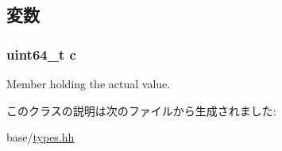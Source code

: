 \subsection{変数}
\hypertarget{classCycles_ac0abe12146ab4394bf65e09035ef054c}{
\subsubsection[{c}]{\setlength{\rightskip}{0pt plus 5cm}uint64\_\-t {\bf c}}}
\label{classCycles_ac0abe12146ab4394bf65e09035ef054c}
Member holding the actual value. 

このクラスの説明は次のファイルから生成されました:\begin{DoxyCompactItemize}
\item 
base/\hyperlink{base_2types_8hh}{types.hh}\end{DoxyCompactItemize}
